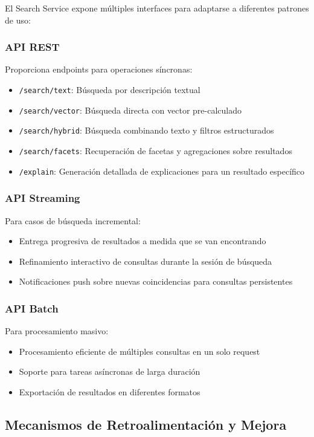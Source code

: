 \documentclass[12pt,a4paper]{article}
\begin{document}
El Search Service expone múltiples interfaces para adaptarse a diferentes patrones de uso:

\subsubsection{API REST}
Proporciona endpoints para operaciones síncronas:
\begin{itemize}
    \item \texttt{/search/text}: Búsqueda por descripción textual
    \item \texttt{/search/vector}: Búsqueda directa con vector pre-calculado
    \item \texttt{/search/hybrid}: Búsqueda combinando texto y filtros estructurados
    \item \texttt{/search/facets}: Recuperación de facetas y agregaciones sobre resultados
    \item \texttt{/explain}: Generación detallada de explicaciones para un resultado específico
\end{itemize}

\subsubsection{API Streaming}
Para casos de búsqueda incremental:
\begin{itemize}
    \item Entrega progresiva de resultados a medida que se van encontrando
    \item Refinamiento interactivo de consultas durante la sesión de búsqueda
    \item Notificaciones push sobre nuevas coincidencias para consultas persistentes
\end{itemize}

\subsubsection{API Batch}
Para procesamiento masivo:
\begin{itemize}
    \item Procesamiento eficiente de múltiples consultas en un solo request
    \item Soporte para tareas asíncronas de larga duración
    \item Exportación de resultados en diferentes formatos
\end{itemize}

\subsection{Mecanismos de Retroalimentación y Mejora}
\label{subsec:ss-retroalimentacion}
\end{document}
